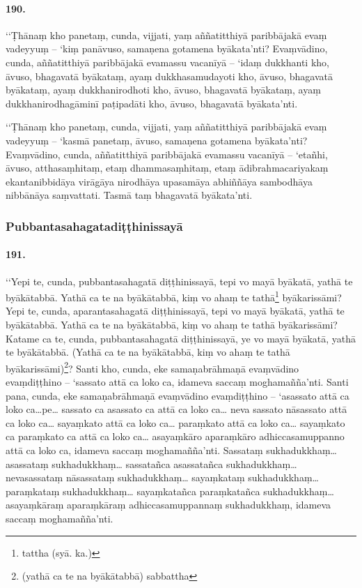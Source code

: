 \paragraph{190.} ‘‘Ṭhānaṃ kho panetaṃ, cunda, vijjati, yaṃ aññatitthiyā paribbājakā evaṃ vadeyyuṃ – ‘kiṃ panāvuso, samaṇena gotamena byākata’nti? Evaṃvādino, cunda, aññatitthiyā paribbājakā evamassu vacanīyā – ‘idaṃ dukkhanti kho, āvuso, bhagavatā byākataṃ, ayaṃ dukkhasamudayoti kho, āvuso, bhagavatā byākataṃ, ayaṃ dukkhanirodhoti kho, āvuso, bhagavatā byākataṃ, ayaṃ dukkhanirodhagāminī paṭipadāti kho, āvuso, bhagavatā byākata’nti.

‘‘Ṭhānaṃ kho panetaṃ, cunda, vijjati, yaṃ aññatitthiyā paribbājakā evaṃ vadeyyuṃ – ‘kasmā panetaṃ, āvuso, samaṇena gotamena byākata’nti? Evaṃvādino, cunda, aññatitthiyā paribbājakā evamassu vacanīyā – ‘etañhi, āvuso, atthasaṃhitaṃ, etaṃ dhammasaṃhitaṃ, etaṃ ādibrahmacariyakaṃ ekantanibbidāya virāgāya nirodhāya upasamāya abhiññāya sambodhāya nibbānāya saṃvattati. Tasmā taṃ bhagavatā byākata’nti.

\subsubsection{Pubbantasahagatadiṭṭhinissayā}

\paragraph{191.} ‘‘Yepi te, cunda, pubbantasahagatā diṭṭhinissayā, tepi vo mayā byākatā, yathā te byākātabbā. Yathā ca te na byākātabbā, kiṃ vo ahaṃ te tathā\footnote{tattha (syā. ka.)} byākarissāmi? Yepi te, cunda, aparantasahagatā diṭṭhinissayā, tepi vo mayā byākatā, yathā te byākātabbā. Yathā ca te na byākātabbā, kiṃ vo ahaṃ te tathā byākarissāmi? Katame ca te, cunda, pubbantasahagatā diṭṭhinissayā, ye vo mayā byākatā, yathā te byākātabbā. (Yathā ca te na byākātabbā, kiṃ vo ahaṃ te tathā byākarissāmi)\footnote{(yathā ca te na byākātabbā) sabbattha}? Santi kho, cunda, eke samaṇabrāhmaṇā evaṃvādino evaṃdiṭṭhino – ‘sassato attā ca loko ca, idameva saccaṃ moghamañña’nti. Santi pana, cunda, eke samaṇabrāhmaṇā evaṃvādino evaṃdiṭṭhino – ‘asassato attā ca loko ca…pe… sassato ca asassato ca attā ca loko ca… neva sassato nāsassato attā ca loko ca… sayaṃkato attā ca loko ca… paraṃkato attā ca loko ca… sayaṃkato ca paraṃkato ca attā ca loko ca… asayaṃkāro aparaṃkāro adhiccasamuppanno attā ca loko ca, idameva saccaṃ moghamañña’nti. Sassataṃ sukhadukkhaṃ… asassataṃ sukhadukkhaṃ… sassatañca asassatañca sukhadukkhaṃ… nevasassataṃ nāsassataṃ sukhadukkhaṃ… sayaṃkataṃ sukhadukkhaṃ… paraṃkataṃ sukhadukkhaṃ… sayaṃkatañca paraṃkatañca sukhadukkhaṃ… asayaṃkāraṃ aparaṃkāraṃ adhiccasamuppannaṃ sukhadukkhaṃ, idameva saccaṃ moghamañña’nti.

